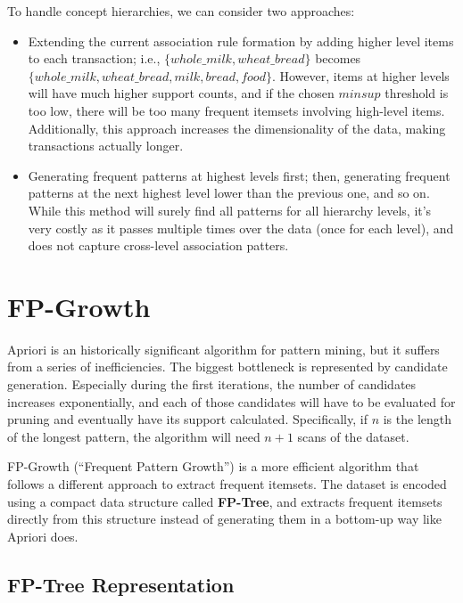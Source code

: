 To handle concept hierarchies, we can consider two approaches:
\begin{itemize}
    \item Extending the current association rule formation by adding higher level items to each transaction; i.e., $\{ whole\_milk, wheat\_bread \}$ becomes $\{ whole\_milk, wheat\_bread, milk, bread, food \}$. However, items at higher levels will have much higher support counts, and if the chosen $minsup$ threshold is too low, there will be too many frequent itemsets involving high-level items. Additionally, this approach increases the dimensionality of the data, making transactions actually longer.

    \item Generating frequent patterns at highest levels first; then, generating frequent patterns at the next highest level lower than the previous one, and so on. While this method will surely find all patterns for all hierarchy levels, it's very costly as it passes multiple times over the data (once for each level), and does not capture cross-level association patters. 
\end{itemize}

\section{FP-Growth}

Apriori is an historically significant algorithm for pattern mining, but it suffers from a series of inefficiencies. The biggest bottleneck is represented by candidate generation. Especially during the first iterations, the number of candidates increases exponentially, and each of those candidates will have to be evaluated for pruning and eventually have its support calculated. Specifically, if $n$ is the length of the longest pattern, the algorithm will need $n+1$ scans of the dataset.

FP-Growth (``Frequent Pattern Growth'') is a more efficient algorithm that follows a different approach to extract frequent itemsets. The dataset is encoded using a compact data structure called \textbf{FP-Tree}, and extracts frequent itemsets directly from this structure instead of generating them in a bottom-up way like Apriori does.

\subsection{FP-Tree Representation}

